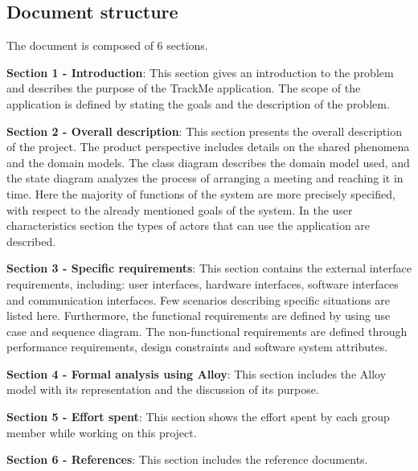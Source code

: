 \subsection{Document structure}
The document is composed of 6 sections.\newline

\textbf{Section 1 - Introduction}: This section gives an introduction to the problem and describes the purpose of the TrackMe application. The scope of the application is defined by stating the goals and the description of the problem.\newline

\textbf{Section 2 - Overall description}: This section presents the overall description of the project. The product perspective includes details on
the shared phenomena and the domain models. The class diagram describes the domain model used,
and the state diagram analyzes the process of arranging a meeting and reaching it in time. Here the
majority of functions of the system are more precisely specified, with respect to the already mentioned
goals of the system. In the user characteristics section the types of actors that can use the application
are described.\newline

\textbf{Section 3 - Specific requirements}: This section contains the external interface requirements, including: user interfaces, hardware interfaces,
software interfaces and communication interfaces. Few scenarios describing specific situations are listed
here. Furthermore, the functional requirements are defined by using use case and sequence diagram.
The non-functional requirements are defined through performance requirements, design constraints
and software system attributes.\newline

\textbf{Section 4 - Formal analysis using Alloy}: This section includes the Alloy model with its representation and the discussion of its purpose.\newline

\textbf{Section 5 - Effort spent}: This section shows the effort spent by each group member while working on this project.\newline

\textbf{Section 6 - References}: This section includes the reference documents.

%